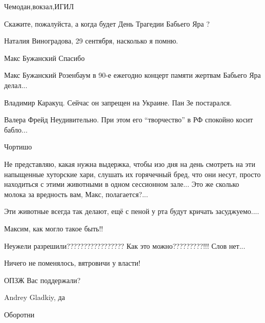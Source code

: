 \begin{itemize}

Чемодан,вокзал,ИГИЛ


Скажите, пожалуйста, а когда будет День Трагедии Бабьего Яра ?


Наталия Виноградова, 29 сентября, насколько я помню.


Макс Бужанский Спасибо


Макс Бужанский Розенбаум в 90-е ежегодно концерт памяти жертвам Бабьего Яра делал...


Владимир Каракуц. Сейчас он запрещен на Украине. Пан Зе постарался.


Валера Фрейд Неудивительно. При этом его \enquote{творчество} в РФ спокойно косит бабло...


Чортишо


Не представляю, какая нужна выдержка, чтобы изо дня на день смотреть на эти
напыщенные хуторские хари, слушать их горячечный бред, что они несут, просто
находиться с этими животными в одном сессионном зале... Это же сколько молока
за вредность вам, Макс, полагается?...


Эти животные всегда так делают, ещё с пеной у рта будут кричать засуджуемо....


Максим, как могло такое быть!!


Неужели разрешили????????????????? Как это можно?????????!!! Слов нет...


Ничего не поменялось, вятровичи у власти!


ОПЗЖ Вас поддержали?


Andrey Gladkiy, да


Оборотни


\end{itemize}
